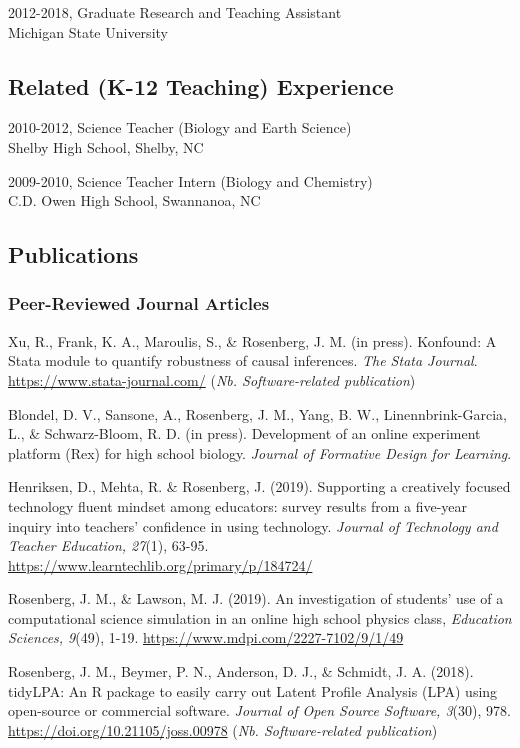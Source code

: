 \documentclass[14,]{article}
\begin{document}
2012-2018, Graduate Research and Teaching Assistant\\
Michigan State University

\subsection{Related (K-12 Teaching)
Experience}\label{related-k-12-teaching-experience}

2010-2012, Science Teacher (Biology and Earth Science)\\
Shelby High School, Shelby, NC

2009-2010, Science Teacher Intern (Biology and Chemistry)\\
C.D. Owen High School, Swannanoa, NC

\subsection{Publications}\label{publications}

\subsubsection{Peer-Reviewed Journal
Articles}\label{peer-reviewed-journal-articles}

Xu, R., Frank, K. A., Maroulis, S., \& Rosenberg, J. M. (in press).
Konfound: A Stata module to quantify robustness of causal inferences.
\emph{The Stata Journal}. \url{https://www.stata-journal.com/}
(\emph{Nb. Software-related publication})

Blondel, D. V., Sansone, A., Rosenberg, J. M., Yang, B. W.,
Linennbrink-Garcia, L., \& Schwarz-Bloom, R. D. (in press). Development
of an online experiment platform (Rex) for high school biology.
\emph{Journal of Formative Design for Learning}.

Henriksen, D., Mehta, R. \& Rosenberg, J. (2019). Supporting a
creatively focused technology fluent mindset among educators: survey
results from a five-year inquiry into teachers' confidence in using
technology. \emph{Journal of Technology and Teacher Education, 27}(1),
63-95. \url{https://www.learntechlib.org/primary/p/184724/}

Rosenberg, J. M., \& Lawson, M. J. (2019). An investigation of students'
use of a computational science simulation in an online high school
physics class, \emph{Education Sciences, 9}(49), 1-19.
\url{https://www.mdpi.com/2227-7102/9/1/49}

Rosenberg, J. M., Beymer, P. N., Anderson, D. J., \& Schmidt, J. A.
(2018). tidyLPA: An R package to easily carry out Latent Profile
Analysis (LPA) using open-source or commercial software. \emph{Journal
of Open Source Software, 3}(30), 978.
\url{https://doi.org/10.21105/joss.00978} (\emph{Nb. Software-related
publication})
\end{document}
